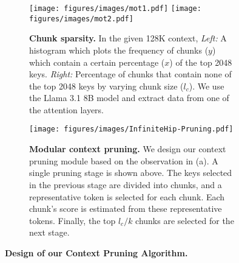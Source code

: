 \begin{figure*}[t]
\vspace{-0.4em}
\centering
\begin{subfigure}[b]{0.44\textwidth}
    \caption{\textbf{Chunk sparsity.} In the given 128K context, \textit{Left:} A histogram which plots the frequency of chunks ($y$) which contain a certain percentage ($x$) of the top 2048 keys. \textit{Right:} Percentage of chunks that contain none of the top 2048 keys by varying chunk size ($l_c$). We use the Llama 3.1 8B model and extract data from one of the attention layers.}
    \label{fig:motivation}%
    \texttt{[image: figures/images/mot1.pdf]}%
    \texttt{[image: figures/images/mot2.pdf]}%
\end{subfigure}
\hfill
\begin{subfigure}[b]{0.54\textwidth}
    \caption{\textbf{Modular context pruning.} We design our context pruning module based on the observation in (a). A single pruning stage is shown above. The keys selected in the previous stage are divided into chunks, and a representative token is selected for each chunk. Each chunk's score is estimated from these representative tokens. Finally, the top $l_c/k$ chunks are selected for the next stage.}
    \label{fig:context_pruning}%
    \texttt{[image: figures/images/InfiniteHip-Pruning.pdf]}%
\end{subfigure}
\vspace{-0.0em}
\caption{\textbf{Design of our Context Pruning Algorithm.}}
\vspace{-0.8em}
\label{fig:algorithms}
\end{figure*}
